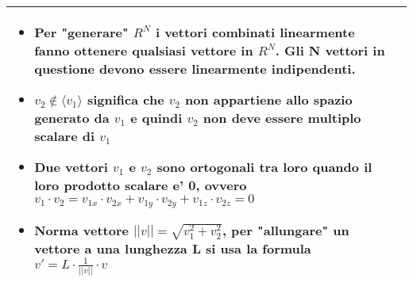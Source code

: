 \documentclass[10pt]{article}
\begin{document}
\begin{landscape}
\begin{minipage}[t]{0.49\textwidth}
\begin{tabular}{| m{2cm} | m{15cm} |}
\begin{itemize}
        \item Per "generare" $R^{N}$ i vettori combinati linearmente fanno ottenere qualsiasi vettore in $R^{N}$. Gli N vettori in questione devono essere linearmente indipendenti.
        \item $v_{2} \notin \langle v_{1} \rangle$ significa che $v_{2}$ non appartiene allo spazio generato da $v_{1}$ e quindi $v_{2}$ non deve essere multiplo scalare di $v_{1}$
        \item Due vettori $v_1$ e $v_2$ sono ortogonali tra loro quando il loro prodotto scalare e' 0, ovvero $v_{1} \cdot v_{2} = v_{1x} \cdot v_{2x} + v_{1y} \cdot v_{2y} + v_{1z} \cdot v_{2z} = 0$
        \item Norma vettore $||v|| = \sqrt{v_{1}^{2} + v_{2}^{2}}$, per "allungare" un vettore a una lunghezza L si usa la formula $v' = L\cdot \frac{1}{||v||}\cdot v$
    \end{itemize}\\
    \hline
\end{tabular}
\end{minipage}

\end{landscape}
\end{document}
